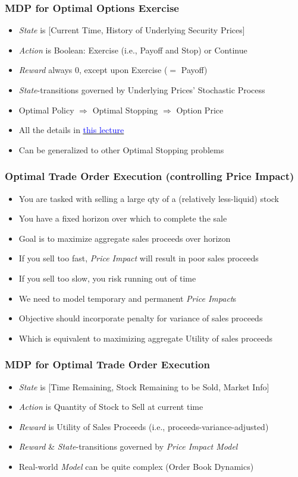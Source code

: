 \documentclass[handout]{beamer}
\begin{document}
\begin{frame}
\frametitle{MDP for Optimal Options Exercise}
\pause
\begin{itemize}[<+->]
\item {\em State} is [Current Time, History of Underlying Security Prices]
\item {\em Action} is Boolean: Exercise (i.e., Payoff and Stop) or Continue
\item {\em Reward} always 0, except upon Exercise ($=$ Payoff)
\item {\em State}-transitions governed by Underlying Prices' Stochastic Process
\item Optimal Policy $\Rightarrow$ Optimal Stopping $\Rightarrow$ Option Price
\item All the details in \href{https://github.com/coverdrive/technical-documents/blob/master/finance/cme241/AmericanOptionsRL.pdf}{\underline{\textcolor{blue}{this lecture}}}
\item Can be generalized to other Optimal Stopping problems
\end{itemize}
\end{frame}

\begin{frame}
\frametitle{Optimal Trade Order Execution (controlling Price Impact)}
\pause
\begin{itemize}[<+->]
\item You are tasked with selling a large qty of a (relatively less-liquid) stock
\item You have a fixed horizon over which to complete the sale
\item Goal is to maximize aggregate sales proceeds over horizon
\item If you sell too fast, {\em Price Impact} will result in poor sales proceeds
\item If you sell too slow, you risk running out of time
\item We need to model temporary and permanent {\em Price Impact}s
\item Objective should incorporate penalty for variance of sales proceeds
\item Which is equivalent to maximizing aggregate Utility of sales proceeds 
\end{itemize}
\end{frame}

\begin{frame}
\frametitle{MDP for Optimal Trade Order Execution}
\pause
\begin{itemize}[<+->]
\item {\em State} is [Time Remaining, Stock Remaining to be Sold, Market Info]
\item {\em Action} is Quantity of Stock to Sell at current time
\item {\em Reward} is Utility of Sales Proceeds (i.e., proceeds-variance-adjusted)
\item {\em Reward} \& {\em State}-transitions governed by {\em Price Impact Model}
\item Real-world {\em Model} can be quite complex (Order Book Dynamics)
\end{itemize}
\end{frame}
\end{document}
